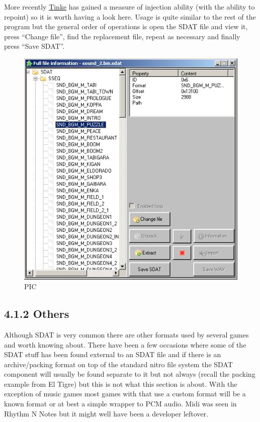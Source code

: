 \documentclass[
]{book}
\begin{document}
More recently \href{https://github.com/pleonex/tinke}{Tinke} has gained a measure of injection ability (with the ability to repoint) so it is worth having a look here. Usage is quite similar to the rest of the program but the general order of operations is open the SDAT file and view it, press ``Change file'', find the replacement file, repeat as necessary and finally press ``Save SDAT''.

\begin{figure}
\centering
\includegraphics{images/138_home_fast6191_romhackingguide_unrenamed_fil____borders_romhackguidesoundtinkereplacement1.png}
\caption{PIC}
\end{figure}

\hypertarget{others}{%
\subsection{4.1.2 Others}\label{others}}

Although SDAT is very common there are other formats used by several games and worth knowing about. There have been a few occasions where some of the SDAT stuff has been found external to an SDAT file and if there is an archive/packing format on top of the standard nitro file system the SDAT component will usually be found separate to it but not always (recall the packing example from El Tigre) but this is not what this section is about. With the exception of music games most games with that use a custom format will be a known format or at best a simple wrapper to PCM audio. Midi was seen in Rhythm N Notes but it might well have been a developer leftover.
\end{document}
